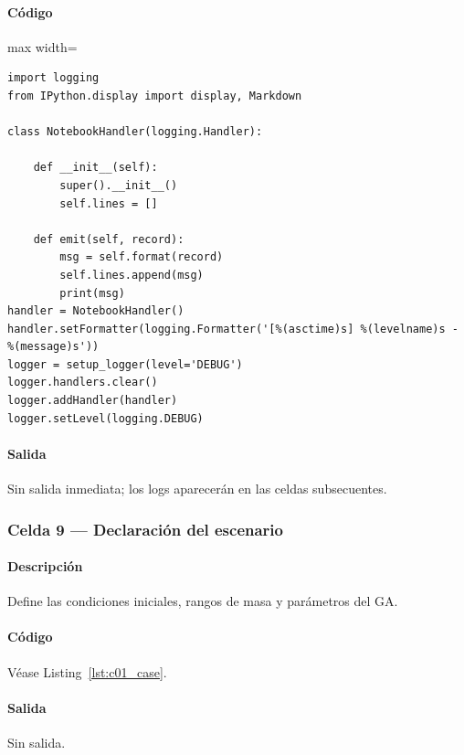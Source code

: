 \paragraph{Código}
\begin{listing}[H]
\caption{Celda 7: configuración de logs interactivos}
\begin{adjustbox}{max width=\textwidth}
\begin{minipage}{\textwidth}
\begin{verbatim}
import logging
from IPython.display import display, Markdown

class NotebookHandler(logging.Handler):

    def __init__(self):
        super().__init__()
        self.lines = []

    def emit(self, record):
        msg = self.format(record)
        self.lines.append(msg)
        print(msg)
handler = NotebookHandler()
handler.setFormatter(logging.Formatter('[%(asctime)s] %(levelname)s - %(message)s'))
logger = setup_logger(level='DEBUG')
logger.handlers.clear()
logger.addHandler(handler)
logger.setLevel(logging.DEBUG)
\end{verbatim}
\end{minipage}
\end{adjustbox}
\end{listing}
\paragraph{Salida} Sin salida inmediata; los logs aparecerán en las celdas subsecuentes.

\subsubsection*{Celda 9 — Declaración del escenario}
\paragraph{Descripción} Define las condiciones iniciales, rangos de masa y parámetros del GA.\
\paragraph{Código} Véase Listing~\ref{lst:c01_case}.
\paragraph{Salida} Sin salida.

